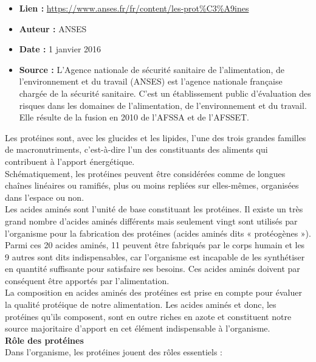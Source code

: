 \documentclass[8pt]{article}
\begin{document}
\begin{itemize}
	\item \textbf{Lien : }  \url{https://www.anses.fr/fr/content/les-prot%C3%A9ines} 
	\item \textbf{Auteur : } ANSES
	\item \textbf{Date : } 1 janvier 2016
	\item \textbf{Source : } L’Agence nationale de sécurité sanitaire de l'alimentation, de l'environnement et du travail (ANSES) est l'agence nationale française chargée de la sécurité sanitaire. C'est un établissement public d'évaluation des risques dans les domaines de l'alimentation, de l'environnement et du travail. Elle résulte de la fusion en 2010 de l'AFSSA et de l'AFSSET. 
\end{itemize}

Les protéines sont, avec les glucides et les lipides, l’une des trois grandes familles de macronutriments, c’est-à-dire l’un des constituants des aliments qui contribuent à l’apport énergétique.\\

Schématiquement, les protéines peuvent être considérées comme de longues chaînes linéaires ou ramifiés, plus ou moins repliées sur elles-mêmes, organisées dans l’espace ou non.\\

Les acides aminés sont l’unité de base constituant les protéines. Il existe un très grand nombre d’acides aminés différents mais seulement vingt sont utilisés par l’organisme pour la fabrication des protéines (acides aminés dits « protéogènes »). Parmi ces 20 acides aminés, 11 peuvent être fabriqués par le corps humain et les 9 autres sont dits indispensables, car l’organisme est incapable de les synthétiser en quantité suffisante pour satisfaire ses besoins. Ces acides aminés doivent par conséquent être apportés par l’alimentation.\\

La composition en acides aminés des protéines est prise en compte pour évaluer la qualité protéique de notre alimentation. Les acides aminés et donc, les protéines qu’ils composent, sont en outre riches en azote et constituent notre source majoritaire d’apport en cet élément indispensable à l’organisme.\\

\textbf{Rôle des protéines}\\

Dans l'organisme, les protéines jouent des rôles essentiels :
	
\end{document}
